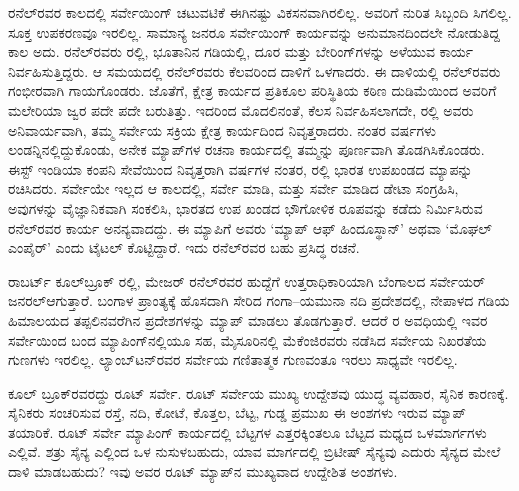 ರನೆಲ್​ರವರ ಕಾಲದಲ್ಲಿ ಸರ್ವೇಯಿಂಗ್​ ಚಟುವಟಿಕೆ ಈಗಿನಷ್ಟು ವಿಕಸನವಾಗಿರಲಿಲ್ಲ. ಅವರಿಗೆ ನುರಿತ ಸಿಬ್ಬಂದಿ ಸಿಗಲಿಲ್ಲ. ಸೂಕ್ತ ಉಪಕರಣವೂ ಇರಲಿಲ್ಲ. ಸಾಮಾನ್ಯ ಜನರೂ ಸರ್ವೇಯಿಂಗ್​ ಕಾರ್ಯವನ್ನು ಅನುಮಾನದಿಂದಲೇ ನೋಡುತಿದ್ದ ಕಾಲ ಅದು. ರನೆಲ್​ರವರು  ರಲ್ಲಿ, ಭೂತಾನಿನ ಗಡಿಯಲ್ಲಿ, ದೂರ ಮತ್ತು ಬೇರಿಂಗ್​ಗಳನ್ನು ಅಳೆಯುವ ಕಾರ್ಯ ನಿರ್ವಹಿಸುತ್ತಿದ್ದರು. ಆ ಸಮಯದಲ್ಲಿ ರನೆಲ್​ರವರು ಕೆಲವರಿಂದ ದಾಳಿಗೆ ಒಳಗಾದರು. ಈ ದಾಳಿಯಲ್ಲಿ ರನೆಲ್​ರವರು ಗಂಭೀರವಾಗಿ ಗಾಯಗೊಂಡರು. ಜೊತೆಗೆ, ಕ್ಷೇತ್ರ ಕಾರ್ಯದ ಪ್ರತಿಕೂಲ ಪರಿಸ್ಥಿತಿಯ ಕಠಿಣ ದುಡಿಮೆಯಿಂದ ಅವರಿಗೆ ಮಲೇರಿಯಾ ಜ್ವರ ಪದೇ ಪದೇ ಬರುತಿತ್ತು. ಇದರಿಂದ ಮೊದಲಿನಂತೆ, ಕೆಲಸ ನಿರ್ವಹಿಸಲಾಗದೇ, ರಲ್ಲಿ ಅವರು ಅನಿವಾರ್ಯವಾಗಿ, ತಮ್ಮ ಸರ್ವೇಯ ಸಕ್ರಿಯ ಕ್ಷೇತ್ರ ಕಾರ್ಯದಿಂದ ನಿವೃತ್ತರಾದರು. ನಂತರ  ವರ್ಷಗಳು ಲಂಡನ್ನಿನಲ್ಲಿದ್ದುಕೊಂಡು, ಅನೇಕ ಮ್ಯಾಪ್​ಗಳ ರಚನಾ ಕಾರ್ಯದಲ್ಲಿ ತಮ್ಮನ್ನು ಪೂರ್ಣವಾಗಿ ತೊಡಗಿಸಿಕೊಂಡರು. ಈಸ್ಟ್​ ಇಂಡಿಯಾ ಕಂಪನಿ ಸೇವೆಯಿಂದ ನಿವೃತ್ತರಾಗಿ  ವರ್ಷಗಳ ನಂತರ,  ರಲ್ಲಿ ಭಾರತ ಉಪಖಂಡದ ಮ್ಯಾಪನ್ನು ರಚಿಸಿದರು. ಸರ್ವೇಯೇ ಇಲ್ಲದ ಆ ಕಾಲದಲ್ಲಿ, ಸರ್ವೇ ಮಾಡಿ, ಮತ್ತು ಸರ್ವೇ ಮಾಡಿದ ಡೇಟಾ ಸಂಗ್ರಹಿಸಿ, ಅವುಗಳನ್ನು ವೈಜ್ಞಾನಿಕವಾಗಿ ಸಂಕಲಿಸಿ, ಭಾರತದ ಉಪ ಖಂಡದ ಭೌಗೋಳಿಕ ರೂಪವನ್ನು ಕಡೆದು ನಿರ್ಮಿಸಿರುವ ರನೆಲ್​ರವರ ಕಾರ್ಯ ಅನನ್ಯವಾದದ್ದು. ಈ ಮ್ಯಾಪಿಗೆ ಅವರು ‘ಮ್ಯಾಪ್​ ಆಫ್​ ಹಿಂದೂಸ್ಥಾನ್​’ ಅಥವಾ ‘ಮೊಘಲ್​ ಎಂಪೈರ್​’ ಎಂದು ಟೈಟಲ್​ ಕೊಟ್ಟಿದ್ದಾರೆ. ಇದು ರನೆಲ್​ರವರ ಬಹು ಪ್ರಸಿದ್ಧ ರಚನೆ.

ರಾಬರ್ಟ್ ಕೂಲ್​ಬ್ರೂಕ್​ ರಲ್ಲಿ, ಮೇಜರ್​ ರನೆಲ್​ರವರ ಹುದ್ದೆಗೆ ಉತ್ತರಾಧಿಕಾರಿಯಾಗಿ ಬೆಂಗಾಲದ ಸರ್ವೇಯರ್​ ಜನರಲ್​ ಆಗುತ್ತಾರೆ. ಬಂಗಾಳ ಪ್ರಾಂತ್ಯಕ್ಕೆ ಹೊಸದಾಗಿ ಸೇರಿದ ಗಂಗಾ–ಯಮುನಾ ನದಿ ಪ್ರದೇಶದಲ್ಲಿ, ನೇಪಾಳದ ಗಡಿಯ ಹಿಮಾಲಯದ ತಪ್ಪಲಿನವರೆಗಿನ ಪ್ರದೇಶಗಳನ್ನು ಮ್ಯಾಪ್​ ಮಾಡಲು ತೊಡಗುತ್ತಾರೆ. ಆದರೆ ರ ಅವಧಿಯಲ್ಲಿ ಇವರ ಸರ್ವೇಯಿಂದ ಬಂದ ಮ್ಯಾಪಿಂಗ್​ನಲ್ಲಿಯೂ ಸಹ, ಮೈಸೂರಿನಲ್ಲಿ ಮೆಕೆಂಜಿರವರು ನಡೆಸಿದ ಸರ್ವೇಯ ನಿಖರತೆಯ ಗುಣಗಳು ಇರಲಿಲ್ಲ. ಲ್ಯಾಂಬ್​ಟನ್​ರವರ ಸರ್ವೇಯ ಗಣಿತಾತ್ಮಕ ಗುಣವಂತೂ ಇರಲು ಸಾಧ್ಯವೇ ಇರಲಿಲ್ಲ.

ಕೂಲ್​ ಬ್ರೂಕ್​ರವರದ್ದು ರೂಟ್​ ಸರ್ವೇ. ರೂಟ್​ ಸರ್ವೇಯ ಮುಖ್ಯ ಉದ್ದೇಶವು ಯುದ್ಧ ವ್ಯವಹಾರ, ಸೈನಿಕ ಕಾರಣಕ್ಕೆ. ಸೈನಿಕರು ಸಂಚರಿಸುವ ರಸ್ತೆ, ನದಿ, ಕೋಟೆ, ಕೊತ್ತಲ, ಬೆಟ್ಟ, ಗುಡ್ಡ ಪ್ರಮುಖ ಈ ಅಂಶಗಳು ಇರುವ ಮ್ಯಾಪ್​ ತಯಾರಿಕೆ. ರೂಟ್​ ಸರ್ವೇ ಮ್ಯಾಪಿಂಗ್​ ಕಾರ್ಯದಲ್ಲಿ ಬೆಟ್ಟಗಳ ಎತ್ತರಕ್ಕಿಂತಲೂ ಬೆಟ್ಟದ ಮಧ್ಯದ ಒಳಮಾರ್ಗಗಳು ಎಲ್ಲಿವೆ. ಶತ್ರು ಸೈನ್ಯ ಎಲ್ಲಿಂದ ಒಳ ನುಸುಳಬಹುದು, ಯಾವ ಮಾರ್ಗದಲ್ಲಿ ಬ್ರಿಟೀಷ್​ ಸೈನ್ಯವು ಎದುರು ಸೈನ್ಯದ ಮೇಲೆ ದಾಳಿ ಮಾಡಬಹುದು? ಇವು ಅವರ ರೂಟ್​ ಮ್ಯಾಪ್​ನ ಮುಖ್ಯವಾದ ಉದ್ದೇಶಿತ ಅಂಶಗಳು.

